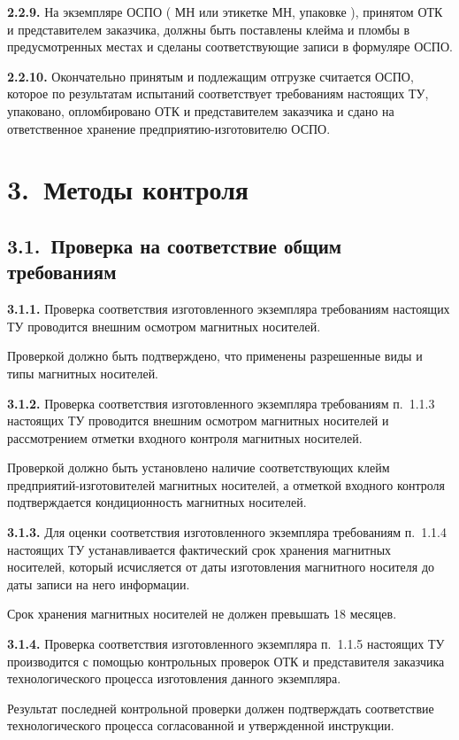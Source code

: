 \documentclass[11pt,a4paper]{article}
\begin{document}
\par\textbf{2.2.9.} На экземпляре ОСПО ( МН или этикетке МН, упаковке ), принятом ОТК и представителем заказчика, должны быть поставлены клейма и пломбы в предусмотренных местах и сделаны соответствующие записи в формуляре ОСПО.\par
\par\textbf{2.2.10.} Окончательно принятым и подлежащим отгрузке считается ОСПО, которое по результатам испытаний соответствует требованиям настоящих ТУ, упаковано, опломбировано ОТК и представителем заказчика и сдано на ответственное хранение предприятию-изготовителю ОСПО.\par
\section*{3.~Методы контроля}
\subsection*{3.1.~Проверка на соответствие общим требованиям}
\par\textbf{3.1.1.} Проверка соответствия изготовленного экземпляра требованиям настоящих ТУ проводится внешним осмотром магнитных носителей.\par
Проверкой должно быть подтверждено, что применены разрешенные виды и типы магнитных носителей.

\par\textbf{3.1.2.} Проверка соответствия изготовленного экземпляра требованиям п.~1.1.3 настоящих ТУ проводится внешним осмотром магнитных носителей и рассмотрением отметки входного контроля магнитных носителей.\par
Проверкой должно быть установлено наличие соответствующих клейм предприятий-изготовителей магнитных носителей, а отметкой входного контроля подтверждается кондиционность магнитных носителей.

\par\textbf{3.1.3.} Для оценки соответствия изготовленного экземпляра требованиям п.~1.1.4 настоящих ТУ устанавливается фактический срок хранения магнитных носителей, который исчисляется от даты изготовления магнитного носителя до даты записи на него информации.\par
Срок хранения магнитных носителей не должен превышать 18 месяцев.

\par\textbf{3.1.4.} Проверка соответствия изготовленного экземпляра п.~1.1.5 настоящих ТУ производится с помощью контрольных проверок ОТК и представителя заказчика технологического процесса изготовления данного экземпляра.\par
Результат последней контрольной проверки должен подтверждать соответствие технологического процесса согласованной и утвержденной инструкции.
\end{document}
